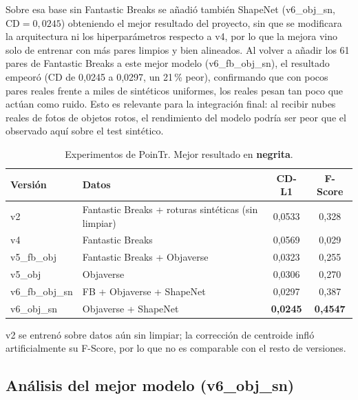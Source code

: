 \documentclass[10pt,a4paper]{report}
\begin{document}
Sobre esa base sin Fantastic Breaks se añadió también ShapeNet (v6\_obj\_sn, CD$=0{,}0245$) obteniendo el mejor resultado del proyecto, sin
que se modificara la arquitectura ni los hiperparámetros respecto a v4, por lo que la mejora
vino solo de entrenar con más pares limpios y bien alineados. Al volver a añadir los
61 pares de Fantastic Breaks a este mejor modelo (v6\_fb\_obj\_sn), el
resultado empeoró (CD de 0,0245 a 0,0297, un 21\,\% peor), confirmando que con pocos pares reales frente a miles de
sintéticos uniformes, los reales pesan tan poco que actúan como ruido. Esto es
relevante para la integración final: al recibir nubes reales de fotos de objetos
rotos, el rendimiento del modelo podría ser peor que el observado aquí sobre el test
sintético.
\begin{table}[H]
  \centering
  \begin{threeparttable}
  \begin{tabular}{llcc}
    \toprule
    Versión & Datos & CD-L1 & F-Score \\
    \midrule
    v2      & Fantastic Breaks + roturas sintéticas (sin limpiar) \  & 0,0533 & 0,328 \\
    v4          & Fantastic Breaks              & 0,0569 & 0,029 \\
    v5\_fb\_obj & Fantastic Breaks + Objaverse  & 0,0323 & 0,255 \\
    v5\_obj     & Objaverse                    & 0,0306 & 0,270 \\
    v6\_fb\_obj\_sn & FB + Objaverse + ShapeNet & 0,0297 & 0,387 \\
    v6\_obj\_sn & Objaverse + ShapeNet        & \textbf{0,0245} & \textbf{0,4547} \\
    \bottomrule
  \end{tabular}
  \begin{tablenotes}\footnotesize
    \item v2 se entrenó sobre datos aún sin limpiar; la corrección de centroide
    infló artificialmente su F-Score, por lo que no es comparable con el resto de
    versiones.
  \end{tablenotes}
  \caption{Experimentos de PoinTr. Mejor resultado en \textbf{negrita}.}
  \label{tab:pointr}
  \end{threeparttable}
\end{table}


\subsection{Análisis del mejor modelo (v6\_obj\_sn)}
\label{subsec:mejor_modelo}
\end{document}
